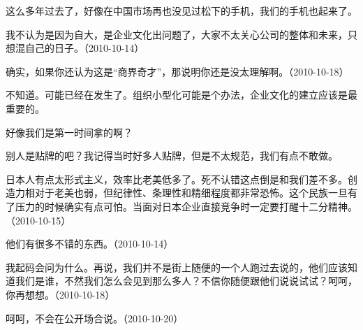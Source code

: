这么多年过去了，好像在中国市场再也没见过松下的手机，我们的手机也起来了。


我不认为是因为自大，是企业文化出问题了，大家不太关心公司的整体和未来，只想混自己的日子。（2010-10-14）


确实，如果你还认为这是“商界奇才”，那说明你还是没太理解啊。（2010-10-18）


不知道。可能已经在发生了。组织小型化可能是个办法，企业文化的建立应该是最重要的。


好像我们是第一时间拿的啊？

别人是贴牌的吧？我记得当时好多人贴牌，但是不太规范，我们有点不敢做。


日本人有点太形式主义，效率比老美低多了。死不认错这点倒是和我们差不多。创造力相对于老美也弱，但纪律性、条理性和精细程度都非常恐怖。这个民族一旦有了压力的时候确实有点可怕。当面对日本企业直接竞争时一定要打醒十二分精神。（2010-10-15）


他们有很多不错的东西。（2010-10-14）


我起码会问为什么。再说，我们并不是街上随便的一个人跑过去说的，他们应该知道我们是谁，不然我们怎么会见到那么多人？不信你随便跟他们说说试试？呵呵，你再想想。（2010-10-18）


呵呵，不会在公开场合说。（2010-10-20）


